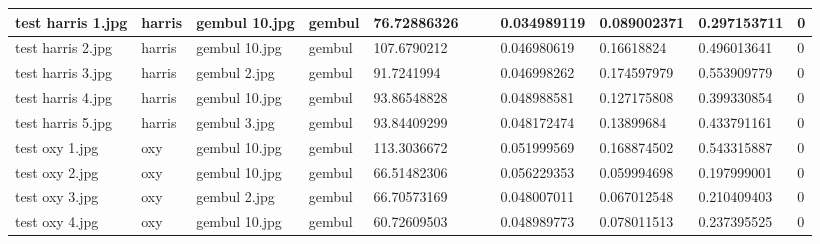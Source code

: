 \begin{landscape}
\begin{longtable}{|p{2cm}|p{1.5cm}|p{2cm}|p{1.5cm}|p{2cm}|p{1cm}|p{2cm}|p{2cm}|p{2cm}|p{2cm}|p{1cm}|}
		test harris 1.jpg    & harris           & gembul 10.jpg         & gembul                      & 76.72886326           &                         &                            & 0.034989119           & 0.089002371           & 0.297153711              & 0                \\ \hline
		test harris 2.jpg    & harris           & gembul 10.jpg         & gembul                      & 107.6790212           &                         &                            & 0.046980619           & 0.16618824            & 0.496013641              & 0                \\ \hline
		test harris 3.jpg    & harris           & gembul 2.jpg          & gembul                      & 91.7241994            &                         &                            & 0.046998262           & 0.174597979           & 0.553909779              & 0                \\ \hline
		test harris 4.jpg    & harris           & gembul 10.jpg         & gembul                      & 93.86548828           &                         &                            & 0.048988581           & 0.127175808           & 0.399330854              & 0                \\ \hline
		test harris 5.jpg    & harris           & gembul 3.jpg          & gembul                      & 93.84409299           &                         &                            & 0.048172474           & 0.13899684            & 0.433791161              & 0                \\ \hline
		test oxy 1.jpg       & oxy              & gembul 10.jpg         & gembul                      & 113.3036672           &                         &                            & 0.051999569           & 0.168874502           & 0.543315887              & 0                \\ \hline
		test oxy 2.jpg       & oxy              & gembul 10.jpg         & gembul                      & 66.51482306           &                         &                            & 0.056229353           & 0.059994698           & 0.197999001              & 0                \\ \hline
		test oxy 3.jpg       & oxy              & gembul 2.jpg          & gembul                      & 66.70573169           &                         &                            & 0.048007011           & 0.067012548           & 0.210409403              & 0                \\ \hline
		test oxy 4.jpg       & oxy              & gembul 10.jpg         & gembul                      & 60.72609503           &                         &                            & 0.048989773           & 0.078011513           & 0.237395525              & 0                \\ \hline

\end{longtable}
\end{landscape}
